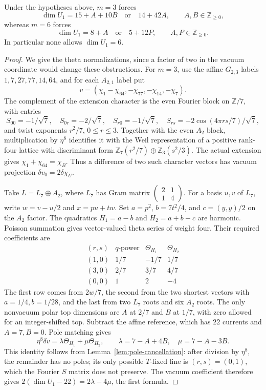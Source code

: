 \begin{proposition}
\label{prop:near-group-current-obstructions}
Under the hypotheses above, $m=3$ forces
\[
 \dim U_1=15+A+10B\quad\text{or}\quad14+42A,
 \qquad A,B\in\mathbb Z_{\ge0},
\]
whereas $m=6$ forces
\[
 \dim U_1=8+A\quad\text{or}\quad5+12P,
 \qquad A,P\in\mathbb Z_{\ge0}.
\]
In particular none allows $\dim U_1=6$.
\end{proposition}
\begin{proof}
We give the theta normalizations, since a factor of two in the vacuum
coordinate would change these obstructions. For $m=3$, use the affine
$G_{2,3}$ labels $1,7,27,77,14,64$, and for each $A_{2,1}$ label put
\[
 v=(\chi_1-\chi_{64},-\chi_{77},-\chi_{14},-\chi_7).
\]
The complement of the extension character is the even Fourier block
on $\mathbb Z/7$, with entries
\[
 S_{00}=-1/\sqrt7,\quad S_{0r}=-2/\sqrt7,\quad
 S_{r0}=-1/\sqrt7,\quad
 S_{rs}=-2\cos(4\pi rs/7)/\sqrt7,
\]
and twist exponents $r^2/7$, $0\le r\le3$.
Together with the even $A_2$ block, multiplication by $\eta^8$
identifies it with the Weil representation of a positive rank-four
lattice with discriminant form
$\mathbb Z_7(r^2/7)\oplus\mathbb Z_3(s^2/3)$.
The actual extension gives $\chi_1+\chi_{64}=\chi_B$. Thus a
difference of two such character vectors has vacuum projection
$\delta v_0=2\delta\chi_U$.

Take $L=L_7\oplus A_2$, where $L_7$ has Gram matrix
$\left(\begin{smallmatrix}2&1\\1&4\end{smallmatrix}\right)$.
For a basis $u,v$ of $L_7$, write $w=v-u/2$ and $x=pu+tw$.
Set $a=p^2$, $b=7t^2/4$, and $c=(y,y)/2$ on the $A_2$ factor.
The quadratics $H_1=a-b$ and $H_2=a+b-c$ are harmonic.
Poisson summation gives vector-valued theta series of weight four.
Their required coefficients are
\[
\begin{array}{c|c|r|r}
 (r,s)&q\text{-power}&\Theta_{H_1}&\Theta_{H_2}\\\hline
 (1,0)&1/7&-1/7&1/7\\
 (3,0)&2/7&3/7&4/7\\
 (0,0)&1&2&-4
\end{array}
\]
The first row comes from $2w/7$, the second from the two shortest
vectors with $a=1/4,b=1/28$, and the last from two $L_7$ roots and
six $A_2$ roots. The only nonvacuum polar top dimensions are $A$ at
$2/7$ and $B$ at $1/7$, with zero allowed for an integer-shifted top.
Subtract the affine reference, which has $22$ currents and $A=7,B=0$.
Pole matching gives
\[
 \eta^8\delta v=\lambda\Theta_{H_1}+\mu\Theta_{H_2},\qquad
 \lambda=7-A+4B,\quad\mu=7-A-3B.
\]
This identity follows from Lemma~\ref{lem:pole-cancellation}: after
division by $\eta^8$, the remainder has no poles; its only possible
$T$-fixed line is $(r,s)=(0,1)$, which the Fourier $S$ matrix does
not preserve. The vacuum coefficient therefore gives
$2(\dim U_1-22)=2\lambda-4\mu$, the first formula.


\end{proof}
